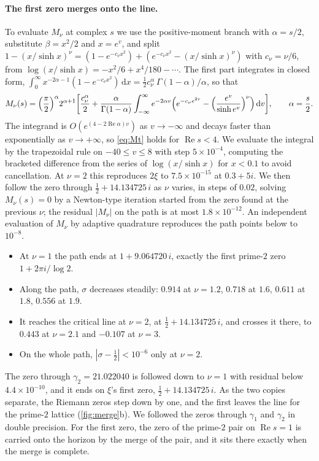 \documentclass[11pt]{article}
\theoremstyle{definition}\newtheorem{definition}[theorem]{Definition}
\theoremstyle{remark}\newtheorem{remark}[theorem]{Remark}
\newcommand{\dd}{\,\mathrm d}\newcommand{\e}{\mathrm e}
\renewcommand{\Re}{\operatorname{Re}}\renewcommand{\Im}{\operatorname{Im}}
\begin{document}
\paragraph{The first zero merges onto the line.} To evaluate $M_\nu$ at complex $s$ we use the positive-moment branch with $\alpha=s/2$, substitute $\beta=x^2/2$ and $x=e^v$, and split $1-(x/\sinh x)^\nu=(1-e^{-c_\nu x^2})+(e^{-c_\nu x^2}-(x/\sinh x)^\nu)$ with $c_\nu=\nu/6$, from $\log(x/\sinh x)=-x^2/6+x^4/180-\cdots$. The first part integrates in closed form, $\int_0^\infty x^{-2\alpha-1}(1-e^{-c_\nu x^2})\dd x=\frac12c_\nu^\alpha\,\Gamma(1-\alpha)/\alpha$, so that
\begin{equation}\label{eq:Mt}
M_\nu(s)=\Bigl(\frac\pi2\Bigr)^{\alpha}2^{\alpha+1}\biggl[\frac{c_\nu^\alpha}2+\frac{\alpha}{\Gamma(1-\alpha)}\int_{-\infty}^{\infty}e^{-2\alpha v}\Bigl(e^{-c_\nu e^{2v}}-\Bigl(\frac{e^v}{\sinh e^v}\Bigr)^\nu\Bigr)\dd v\biggr],\qquad \alpha=\frac s2 .
\end{equation}
The integrand is $O(e^{(4-2\Re\alpha)v})$ as $v\to-\infty$ and decays faster than exponentially as $v\to+\infty$, so \eqref{eq:Mt} holds for $\Re s<4$. We evaluate the integral by the trapezoidal rule on $-40\le v\le8$ with step $5\times10^{-4}$, computing the bracketed difference from the series of $\log(x/\sinh x)$ for $x<0.1$ to avoid cancellation. At $\nu=2$ this reproduces $2\xi$ to $7.5\times10^{-15}$ at $0.3+5i$. We then follow the zero through $\tfrac12+14.134725\,i$ as $\nu$ varies, in steps of $0.02$, solving $M_\nu(s)=0$ by a Newton-type iteration started from the zero found at the previous $\nu$; the residual $|M_\nu|$ on the path is at most $1.8\times10^{-12}$. An independent evaluation of $M_\nu$ by adaptive quadrature reproduces the path points below to $10^{-8}$.
\begin{itemize}
\item At $\nu=1$ the path ends at $1+9.064720\,i$, exactly the first prime-$2$ zero $1+2\pi i/\log2$.
\item Along the path, $\sigma$ decreases steadily: $0.914$ at $\nu=1.2$, $0.718$ at $1.6$, $0.611$ at $1.8$, $0.556$ at $1.9$.
\item It reaches the critical line at $\nu=2$, at $\tfrac12+14.134725\,i$, and crosses it there, to $0.443$ at $\nu=2.1$ and $-0.107$ at $\nu=3$.
\item On the whole path, $|\sigma-\tfrac12|<10^{-6}$ only at $\nu=2$.
\end{itemize}
The zero through $\gamma_2=21.022040$ is followed down to $\nu=1$ with residual below $4.4\times10^{-10}$, and it ends on $\xi$'s first zero, $\tfrac12+14.134725\,i$. As the two copies separate, the Riemann zeros step down by one, and the first leaves the line for the prime-$2$ lattice (\cref{fig:merge}b). We followed the zeros through $\gamma_1$ and $\gamma_2$ in double precision. For the first zero, the zero of the prime-$2$ pair on $\Re s=1$ is carried onto the horizon by the merge of the pair, and it sits there exactly when the merge is complete.
\end{document}
